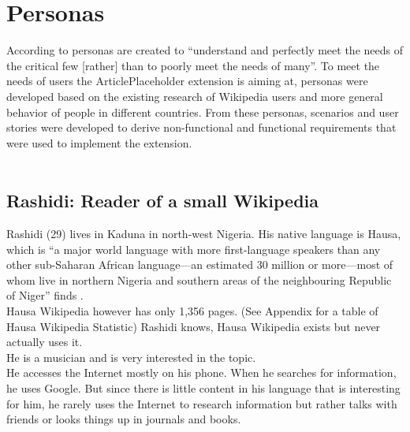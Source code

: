 \chapter{Personas}

According to \citet[182]{design:01} personas are created to ``understand and perfectly meet the needs of the critical few [rather] than to poorly meet the needs of many''. To meet the needs of users the ArticlePlaceholder extension is aiming at, personas were developed based on the existing research of Wikipedia users and more general behavior of people in different countries. From these personas, scenarios and user stories were developed to derive non-functional and functional requirements that were used to implement the extension. \\
\\
\section{Rashidi: Reader of a small Wikipedia}
Rashidi (29) lives in Kaduna in north-west Nigeria. His native language is Hausa, which is ``a major world language with more first-language speakers than any other sub-Saharan African language---an estimated 30 million or more---most of whom live in northern Nigeria and southern areas of the neighbouring Republic of Niger'' finds \citet[1]{hausa}. \\
Hausa Wikipedia however has only 1,356 pages. (See Appendix for a table of Hausa Wikipedia Statistic) Rashidi knows, Hausa Wikipedia exists but never actually uses it. \\
He is a musician and is very interested in the topic. \\
He accesses the Internet mostly on his phone. When he searches for information, he uses Google. But since there is little content in his language that is interesting for him, he rarely uses the Internet to research information but rather talks with friends or looks things up in journals and books.


